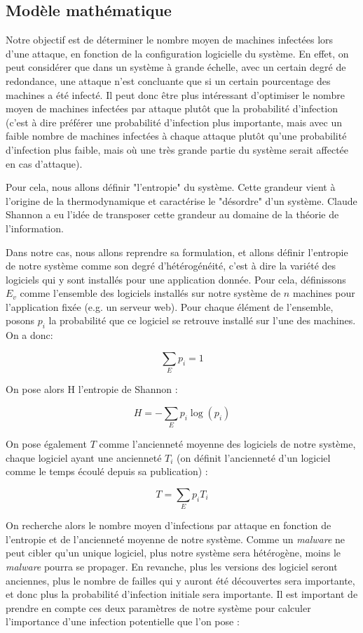\subsection{Modèle mathématique}\label{sec:modelMath}

Notre objectif est de déterminer le nombre moyen de machines infectées lors d'une attaque, en fonction de la configuration logicielle du système. En effet, on peut considérer que dans un système à grande échelle, avec un certain degré de redondance, une attaque n'est concluante que si un certain pourcentage des machines a été infecté. Il peut donc être plus intéressant d'optimiser le nombre moyen de machines infectées par attaque plutôt que la probabilité d'infection (c'est à dire préférer une probabilité d'infection plus importante, mais avec un faible nombre de machines infectées à chaque attaque plutôt qu'une probabilité d'infection plus faible, mais où une très grande partie du système serait affectée en cas d'attaque).

Pour cela, nous allons définir "l'entropie" du système. Cette grandeur vient à l'origine de la thermodynamique et caractérise le "désordre" d'un système. Claude Shannon a eu l'idée de transposer cette grandeur au domaine de la théorie de l'information\cite{entropie_shannon}.

Dans notre cas, nous allons reprendre sa formulation, et allons définir l'entropie de notre système comme son degré d'hétérogénéité, c'est à dire la variété des logiciels qui y sont installés pour une application donnée.
Pour cela, définissons $E_v$ comme l'ensemble des logiciels installés sur notre système de $n$ machines pour l'application fixée (e.g. un serveur web). Pour chaque élément de l'ensemble, posons $p_i$ la probabilité que ce logiciel se retrouve installé sur l'une des machines. 
On a donc:

\[
\sum_{E}p_i=1
\]

On pose alors H l'entropie de Shannon :

\[
H=-\sum_E p_i \log(p_i)
\]

On pose également $T$ comme l'ancienneté moyenne des logiciels de notre système, chaque logiciel ayant une ancienneté $T_i$ (on définit l'ancienneté d'un logiciel comme le temps écoulé depuis sa publication)  :

\[
T=\sum_E p_i T_i
\]

On recherche alors le nombre moyen d'infections par attaque en fonction de l'entropie et de l'ancienneté moyenne de notre système. Comme un \textit{malware} ne peut cibler qu'un unique logiciel, plus notre système sera hétérogène, moins le \textit{malware} pourra se propager. En revanche, plus les versions des logiciel seront anciennes, plus le nombre de failles qui y auront été découvertes sera importante, et donc plus la probabilité d'infection initiale sera importante. Il est important de prendre en compte ces deux paramètres de notre système pour calculer l'importance d'une infection potentielle que l'on pose : 


